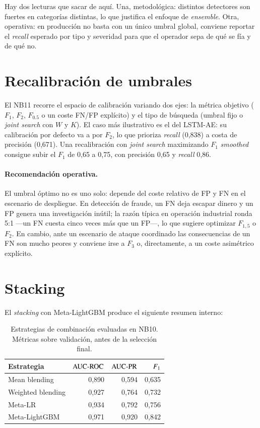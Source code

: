 Hay dos lecturas que sacar de aquí. Una, metodológica: distintos detectores son fuertes en categorías distintas, lo que justifica el enfoque de \textit{ensemble}. Otra, operativa: en producción no basta con un único umbral global, conviene reportar el \textit{recall} esperado por tipo y severidad para que el operador sepa de qué se fía y de qué no.

\section{Recalibración de umbrales}
\label{sec:resultados-recalibracion}

El NB11 recorre el espacio de calibración variando dos ejes: la métrica objetivo ($F_1$, $F_2$, $F_{0.5}$ o un coste FN/FP explícito) y el tipo de búsqueda (umbral fijo o \textit{joint search} con $W$ y $K$). El caso más ilustrativo es el del LSTM-AE: su calibración por defecto va a por $F_2$, lo que prioriza \textit{recall} (0{,}838) a costa de precisión (0{,}671). Una recalibración con \textit{joint search} maximizando $F_1$ \textit{smoothed} consigue subir el $F_1$ de 0{,}65 a 0{,}75, con precisión 0{,}65 y \textit{recall} 0{,}86.

\paragraph{Recomendación operativa.} El umbral óptimo no es uno solo: depende del coste relativo de FP y FN en el escenario de despliegue. En detección de fraude, un FN deja escapar dinero y un FP genera una investigación inútil; la razón típica en operación industrial ronda 5:1 ---un FN cuesta cinco veces más que un FP---, lo que sugiere optimizar $F_{1{,}5}$ o $F_2$. En cambio, ante un escenario de ataque coordinado las consecuencias de un FN son mucho peores y conviene irse a $F_3$ o, directamente, a un coste asimétrico explícito.

\section{Stacking}
\label{sec:resultados-ensemble}

El \emph{stacking} con Meta-LightGBM produce el siguiente resumen interno:

\begin{table}[H]
\centering
\caption{Estrategias de combinación evaluadas en NB10. Métricas sobre validación, antes de la selección final.}
\label{tab:stacking}
\small
\begin{tabularx}{\textwidth}{l r r r}
\toprule
Estrategia & $\text{AUC-ROC}$ & $\text{AUC-PR}$ & $F_{1}$ \\
\midrule
Mean blending     & 0{,}890 & 0{,}594 & 0{,}635 \\
Weighted blending & 0{,}927 & 0{,}764 & 0{,}732 \\
Meta-LR           & 0{,}934 & 0{,}792 & 0{,}756 \\
Meta-LightGBM     & 0{,}971 & 0{,}920 & 0{,}842 \\
\bottomrule
\end{tabularx}
\end{table}

